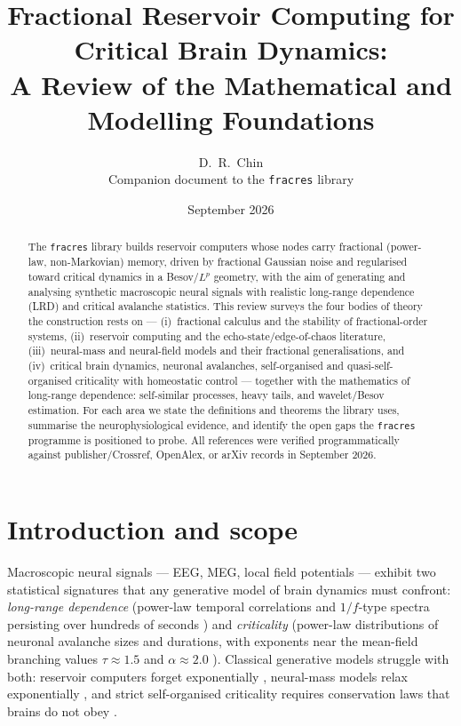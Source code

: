 \documentclass[11pt,a4paper]{article}
\title{Fractional Reservoir Computing for Critical Brain Dynamics:\\
       A Review of the Mathematical and Modelling Foundations}
\author{D.~R.~Chin\\\small Companion document to the \texttt{fracres} library}
\date{September 2026}
\begin{document}
\maketitle

\begin{abstract}
\noindent
The \texttt{fracres} library builds reservoir computers whose nodes carry
fractional (power-law, non-Markovian) memory, driven by fractional Gaussian
noise and regularised toward critical dynamics in a Besov/$L^p$ geometry, with
the aim of generating and analysing synthetic macroscopic neural signals with
realistic long-range dependence (LRD) and critical avalanche statistics. This
review surveys the four bodies of theory the construction rests on ---
(i)~fractional calculus and the stability of fractional-order systems,
(ii)~reservoir computing and the echo-state/edge-of-chaos literature,
(iii)~neural-mass and neural-field models and their fractional
generalisations, and
(iv)~critical brain dynamics, neuronal avalanches, self-organised and
quasi-self-organised criticality with homeostatic control --- together with
the mathematics of long-range dependence: self-similar processes, heavy tails,
and wavelet/Besov estimation. For each area we state the definitions and
theorems the library uses, summarise the neurophysiological evidence, and
identify the open gaps the \texttt{fracres} programme is positioned to probe.
All references were verified programmatically against publisher/Crossref,
OpenAlex, or arXiv records in September 2026.
\end{abstract}

\tableofcontents
\newpage

\section{Introduction and scope}
\label{sec:intro}

Macroscopic neural signals --- EEG, MEG, local field potentials --- exhibit two
statistical signatures that any generative model of brain dynamics must
confront: \emph{long-range dependence} (power-law temporal correlations and
$1/f$-type spectra persisting over hundreds of seconds
\cite{linkenkaer2001long,he2014scale}) and \emph{criticality} (power-law
distributions of neuronal avalanche sizes and durations, with exponents near
the mean-field branching values $\tau \approx 1.5$ and $\alpha \approx 2.0$
\cite{beggs2003neuronal,chialvo2010emergent}). Classical generative models
struggle with both: reservoir computers forget exponentially
\cite{jaeger2002memory}, neural-mass models relax exponentially
\cite{jansen1995electroencephalogram}, and strict self-organised criticality
requires conservation laws that brains do not obey \cite{bonachela2009self}.
\end{document}
